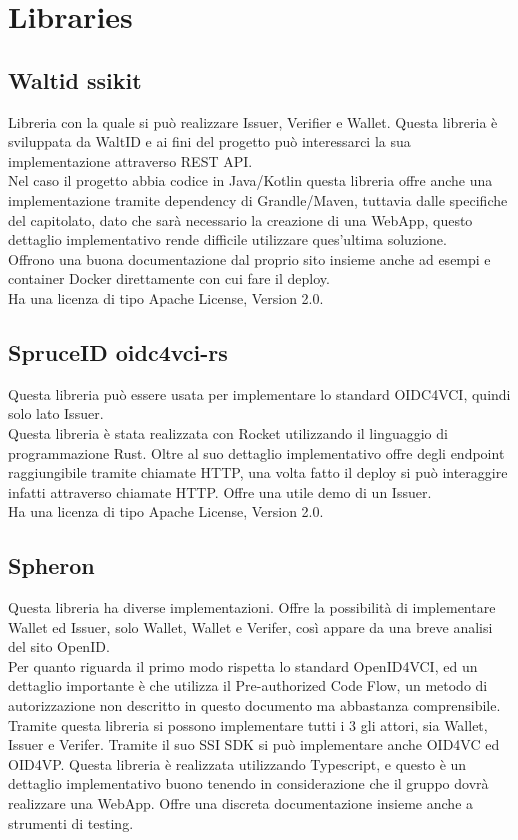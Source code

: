\section{Libraries}
\subsection{Waltid ssikit}
Libreria con la quale si può realizzare Issuer, Verifier e Wallet.
Questa libreria è sviluppata da WaltID e ai fini del progetto può interessarci la sua implementazione attraverso REST API.\\
Nel caso il progetto abbia codice in Java/Kotlin questa libreria offre anche una implementazione tramite dependency di Grandle/Maven, tuttavia 
dalle specifiche del capitolato, dato che sarà necessario la creazione di una WebApp, questo dettaglio implementativo rende 
difficile utilizzare ques'ultima soluzione.\\
Offrono una buona documentazione dal proprio sito insieme anche ad esempi e container Docker direttamente con cui fare il deploy.\\
Ha una licenza di tipo  Apache License, Version 2.0.

\subsection{SpruceID oidc4vci-rs}
Questa libreria può essere usata per implementare lo standard OIDC4VCI, quindi solo lato Issuer.\\
Questa libreria è stata realizzata con Rocket utilizzando il linguaggio di programmazione Rust.
Oltre al suo dettaglio implementativo offre degli endpoint raggiungibile tramite chiamate HTTP, 
una volta fatto il deploy si può interaggire infatti attraverso chiamate HTTP.
Offre una utile demo di un Issuer.
\\Ha una licenza di tipo  Apache License, Version 2.0.

\subsection{Spheron}
Questa libreria ha diverse implementazioni.
Offre la possibilità di implementare Wallet ed Issuer, solo Wallet, Wallet e Verifer, così appare da una breve analisi del sito OpenID.\\
Per quanto riguarda il primo modo rispetta lo standard OpenID4VCI, ed un dettaglio importante
è che utilizza il Pre-authorized Code Flow, un metodo di autorizzazione non descritto in questo documento ma abbastanza comprensibile.\\
Tramite questa libreria si possono implementare tutti i 3 gli attori, sia Wallet, Issuer e Verifer.
Tramite il suo SSI SDK si può implementare anche OID4VC ed OID4VP.
Questa libreria è realizzata utilizzando Typescript, e questo è un dettaglio implementativo buono tenendo in considerazione
che il gruppo dovrà realizzare una WebApp.
Offre una discreta documentazione insieme anche a strumenti di testing.

